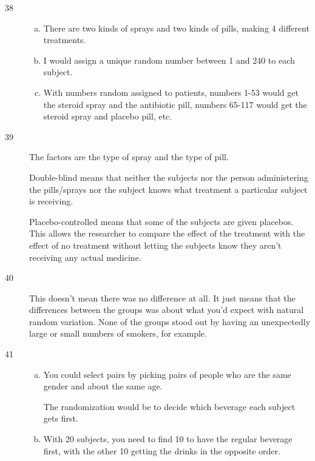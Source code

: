 \documentclass[letterpaper, landscape]{exam}
\begin{document}
\begin{description}
      \item[38]
        \begin{enumerate}[(a)]
          \item There are two kinds of sprays and two kinds of pills, making 4
            different treatments.  

          \item I would assign a unique random number between 1 and 240 to each
            subject.

          \item With numbers random assigned to patients, numbers 1-53 would get
            the steroid spray and the antibiotic pill, numbers 65-117 would get
            the steroid spray and placebo pill, etc.
        \end{enumerate}

      \item[39]
        The factors are the type of spray and the type of pill.

        Double-blind means that neither the subjects nor the person
        administering the pills/sprays nor the subject knows what treatment a
        particular subject is receiving.

        Placebo-controlled means that some of the subjects are given placebos.
        This allows the researcher to compare the effect of the treatment with
        the effect of no treatment without letting the subjects know they
        aren't receiving any actual medicine.

      \item[40] This doesn't mean there was no difference at all.  It just means
        that the differences between the groups was about what you'd expect with
        natural random variation.  None of the groups stood out by having an
        unexpectedly large or small numbers of smokers, for example.

      \item[41] 
        \begin{enumerate}[(a)]
          \item You could select pairs by picking pairs of people who are the
            same gender and about the same age.  
            
            The randomization would be to decide which beverage each subject
            gets first.

          \item With 20 subjects, you need to find 10 to have the regular
            beverage first, with the other 10 getting the drinks in the opposite
            order.


\end{enumerate}
\end{description}
\end{document}
